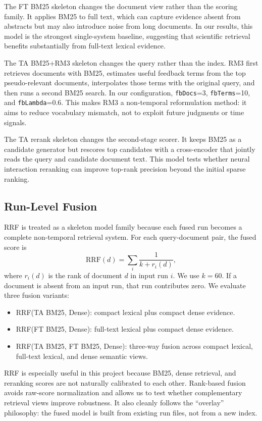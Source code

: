 \documentclass[11pt]{article}
\begin{document}
The FT BM25 skeleton changes the document view rather than the scoring family. It applies BM25 to full text, which can capture evidence absent from abstracts but may also introduce noise from long documents. In our results, this model is the strongest single-system baseline, suggesting that scientific retrieval benefits substantially from full-text lexical evidence.

The TA BM25+RM3 skeleton changes the query rather than the index. RM3 first retrieves documents with BM25, estimates useful feedback terms from the top pseudo-relevant documents, interpolates those terms with the original query, and then runs a second BM25 search. In our configuration, \texttt{fbDocs}=3, \texttt{fbTerms}=10, and \texttt{fbLambda}=0.6. This makes RM3 a non-temporal reformulation method: it aims to reduce vocabulary mismatch, not to exploit future judgments or time signals.

The TA rerank skeleton changes the second-stage scorer. It keeps BM25 as a candidate generator but rescores top candidates with a cross-encoder that jointly reads the query and candidate document text. This model tests whether neural interaction reranking can improve top-rank precision beyond the initial sparse ranking.

\subsection{Run-Level Fusion}

RRF is treated as a skeleton model family because each fused run becomes a complete non-temporal retrieval system. For each query-document pair, the fused score is
\[
\mathrm{RRF}(d) = \sum_i \frac{1}{k + r_i(d)},
\]
where $r_i(d)$ is the rank of document $d$ in input run $i$. We use $k=60$. If a document is absent from an input run, that run contributes zero. We evaluate three fusion variants:
\begin{itemize}[leftmargin=1.5em]
    \item RRF(TA BM25, Dense): compact lexical plus compact dense evidence.
    \item RRF(FT BM25, Dense): full-text lexical plus compact dense evidence.
    \item RRF(TA BM25, FT BM25, Dense): three-way fusion across compact lexical, full-text lexical, and dense semantic views.
\end{itemize}

RRF is especially useful in this project because BM25, dense retrieval, and reranking scores are not naturally calibrated to each other. Rank-based fusion avoids raw-score normalization and allows us to test whether complementary retrieval views improve robustness. It also cleanly follows the ``overlay'' philosophy: the fused model is built from existing run files, not from a new index.
\end{document}
